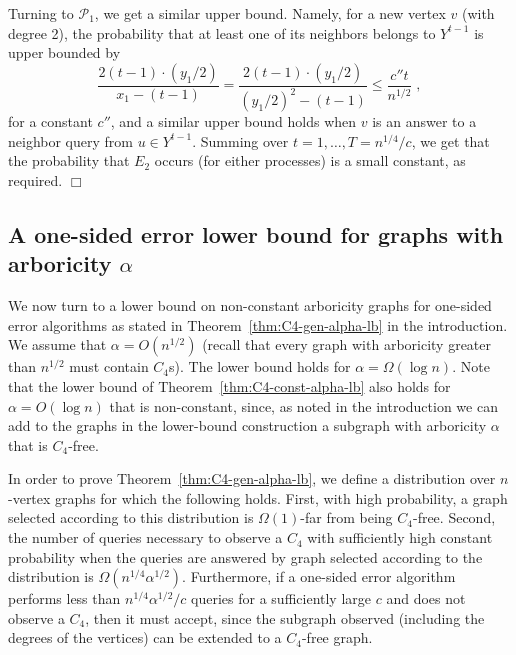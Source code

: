 \documentclass{article}
\newcommand{\calD}{{\mathcal{D}}}
\newcommand{\calP}{{\mathcal{P}}}
\newenvironment{proof}{\smallskip\noindent{\bf Proof:}}%
        {\hspace*{\fill}$\Box$\par}
\newcommand{\commentt}[1]{ {}}
\newcommand{\ICALPCR}[1]{{#1}}
\newcommand{\ForFuture}[1]{}
\begin{document}
\begin{proof}
Turning to $\calP_1$, we get a similar upper bound. Namely, for a new vertex $v$ (with degree 2), the probability that at least one of its neighbors belongs to $Y^{t-1}$ is upper bounded by
\ICALPCR{
$$\frac{2(t-1)\cdot (y_1/2)}{x_1-(t-1)} =\frac{2(t-1)\cdot (y_1/2)}{(y_1/2)^2-(t-1)} 
\leq \frac{c'' t}{n^{1/2}}\;,$$
}
for a constant $c''$,
 and a similar upper bound holds when $v$ is an answer to a neighbor query from $u\in Y^{t-1}$.
  Summing over $t=1,\dots,T= n^{1/4}/c$, we get that the probability that $E_2$ occurs (for either processes) is a small constant, as required.
\end{proof}

\subsection{A one-sided error lower bound for graphs with arboricity $\alpha$}
We now turn to a lower bound on non-constant arboricity graphs for one-sided error algorithms \ICALPCR{as stated in Theorem~\ref{thm:C4-gen-alpha-lb} in the introduction}. We assume that $\alpha =O(n^{1/2})$ (recall that every graph with  arboricity greater than $n^{1/2}$ must contain $C_4$s). %
The lower bound holds for $\alpha = \Omega(\log n)$. Note that the lower bound of Theorem~\ref{thm:C4-const-alpha-lb} also holds for $\alpha = O(\log n)$ that is non-constant, since, as noted in the introduction  we can add to the graphs in the lower-bound construction a subgraph with arboricity $\alpha$ that is $C_4$-free. \ForFuture{D: reference to Fox? or something else}

In order to prove Theorem~\ref{thm:C4-gen-alpha-lb}, we define
a distribution %
over $n$-vertex graphs for which the following holds. First, with high probability, a graph selected according to %
this distribution is $\Omega(1)$-far from being $C_4$-free. Second, the number of queries necessary to observe a $C_4$ with sufficiently high constant probability when the queries are answered by graph selected according to
the distribution %
is $\Omega(n^{1/4}\alpha^{1/2})$.
Furthermore, if a one-sided error algorithm performs less than 
$n^{1/4}\alpha^{1/2}/c$ queries for a sufficiently large $c$ and does not observe a $C_4$, then it must accept, since the subgraph observed (including the degrees of the vertices) can be extended to a $C_4$-free graph.
\end{document}

